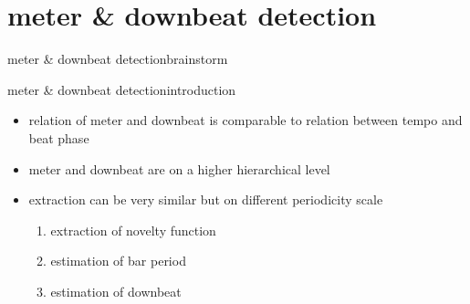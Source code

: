         \section[meter]{meter \& downbeat detection}
            \begin{frame}{meter \& downbeat detection}{brainstorm}
            \end{frame}
            \begin{frame}{meter \& downbeat detection}{introduction}
                \begin{itemize}
                    \item   relation of meter and downbeat is comparable to relation between tempo and beat phase
                    \item   meter and downbeat are on a higher hierarchical level
                    \smallskip
                    \item<2-> extraction can be very similar but on different periodicity scale
                        \begin{enumerate}
                            \item   extraction of novelty function
                            \item   estimation of bar period
                            \item   estimation of downbeat
                        \end{enumerate}
                \end{itemize}
            \end{frame}
